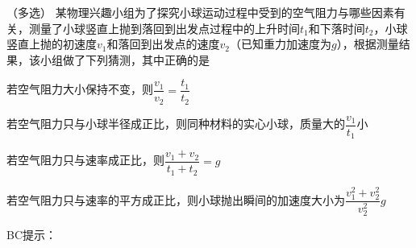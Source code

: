（多选）
某物理兴趣小组为了探究小球运动过程中受到的空气阻力与哪些因素有关，测量了小球竖直上抛到落回到出发点过程中的上升时间\(t_1\)和下落时间\(t_2\)，小球竖直上抛的初速度\(v_1\)和落回到出发点的速度\(v_2\)（已知重力加速度为\(g\)），根据测量结果，该小组做了下列猜测，其中正确的是\paren[]
\begin{choices}
	\item 若空气阻力大小保持不变，则\(\dfrac{v_1}{v_2} = \dfrac{t_1}{t_2}\)
	\item 若空气阻力只与小球半径成正比，则同种材料的实心小球，质量大的\(\dfrac{v_1}{t_1}\)小
	\item 若空气阻力只与速率成正比，则\(\dfrac{v_1 + v_2}{t_1 + t_2} = g\)
	\item 若空气阻力只与速率的平方成正比，则小球抛出瞬间的加速度大小为\(\dfrac{v_1^2 + v_2^2}{v_2^2}g\)
\end{choices}
\begin{answer}
    BC\qquad 提示：
\end{answer}